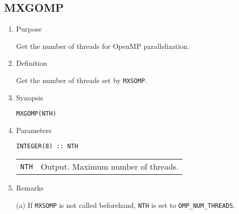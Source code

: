 \documentclass[a4paper]{scrartcl}
\begin{document}

\subsection{MXGOMP}

\begin{enumerate}

\item Purpose  

Get the number of threads for OpenMP parallelization.

\item Definition

Get the number of threads set by \texttt{MXSOMP}.

\item Synopsis

\texttt{MXGOMP(NTH)}

\item Parameters

\begin{verbatim}
INTEGER(8) :: NTH
\end{verbatim}

\begin{tabular}{ll}
\texttt{NTH} & Output. Maximum number of threads.
\end{tabular}

\item Remarks
  
  (a) If \texttt{MXSOMP} is not called beforehand,
  \texttt{NTH} is set to \texttt{OMP\_NUM\_THREADS}.

\end{enumerate}
\end{document}
